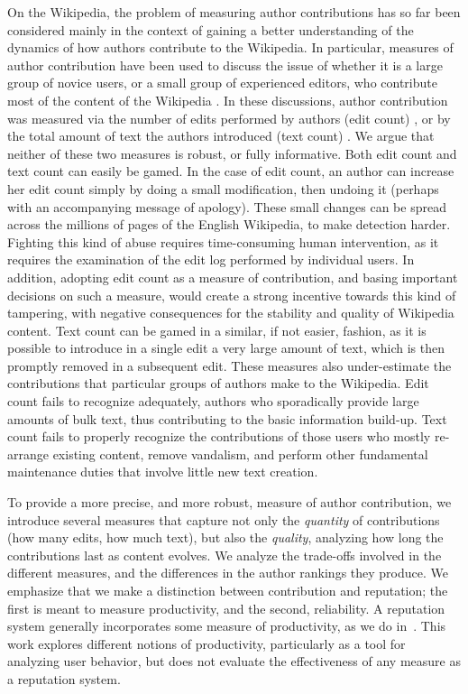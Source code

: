 On the Wikipedia, the problem of measuring author contributions has
so far been considered mainly in the context of gaining a better
understanding of the dynamics of how authors contribute to the
Wikipedia. 
In particular, measures of author contribution have been used to
discuss the issue of whether it is a large group of novice users, or a
small group of experienced editors, who contribute most of the
content of the Wikipedia \cite{Wales2005,Swartz2006,Bourgeoisie2007}. 
In these discussions, author contribution was measured via the number
of edits performed by authors (edit count) \cite{Wales2005,EditsEqQuality2007,
Bourgeoisie2007,WikiDashboard2008,OrtegaBarahona2007,SteinHess2007},
or by the total amount of text the authors introduced (text count)
\cite{Swartz2006}. 
We argue that neither of these two measures is robust, or fully
informative. 
Both edit count and text count can easily be gamed. 
In the case of edit count, an author can increase her edit count
simply by doing a small modification, then undoing it (perhaps with an
accompanying message of apology).  
These small changes can be spread across the millions of pages of the
English Wikipedia, to make detection harder. 
Fighting this kind of abuse requires time-consuming human
intervention, as it requires the examination of the edit log performed
by individual users. 
In addition, adopting edit count as a measure of contribution,
and basing important decisions on such a measure, would create a strong
incentive towards this kind of tampering, with negative consequences
for the stability and quality of Wikipedia content. 
Text count can be gamed in a similar, if not easier, fashion, as it is
possible to introduce in a single edit a very large amount of text,
which is then promptly removed in a subsequent edit. 
These measures also under-estimate the contributions that particular
groups of authors make to the Wikipedia. 
Edit count fails to recognize adequately, authors who sporadically provide
large amounts of bulk text, thus contributing to the basic information
build-up.
Text count fails to properly recognize the contributions of those
users who mostly re-arrange existing content, remove vandalism, and
perform other fundamental maintenance duties that involve little new
text creation. 

To provide a more precise, and more robust, measure of author
contribution, we introduce several measures that capture not only the 
{\em quantity\/} of contributions (how many edits, how much text),
but also the {\em quality\/}, analyzing how long the contributions last
as content evolves. 
We analyze the trade-offs involved in the different measures, and the
differences in the author rankings they produce. 
We emphasize that we make a distinction between
contribution and reputation; the first is meant to measure productivity,
and the second, reliability.
A reputation system generally incorporates some measure of productivity,
as we do in~\cite{Adler2007}.
This work explores different notions of productivity,
particularly as a tool for analyzing user behavior,
but does not evaluate the effectiveness of any measure
as a reputation system.

